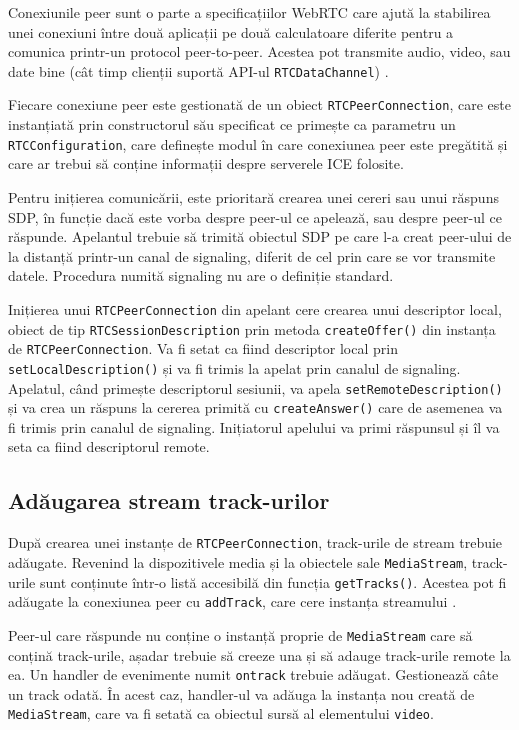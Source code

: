 \indent \par Conexiunile peer sunt o parte a specificațiilor WebRTC care ajută la stabilirea unei conexiuni între două aplicații pe două calculatoare diferite pentru a comunica printr-un protocol peer-to-peer. Acestea pot transmite audio, video, sau date bine (cât timp clienții suportă API-ul \texttt{RTCDataChannel}) \cite{WebPeer2014}.
\indent \par Fiecare conexiune peer este gestionată de un obiect \texttt{RTCPeerConnection}, care este instanțiată prin constructorul său specificat ce primește ca parametru un \texttt{RTCConfiguration}, care definește modul în care conexiunea peer este pregătită și care ar trebui să conține informații despre serverele ICE folosite.
\indent \par Pentru inițierea comunicării, este prioritară crearea unei cereri sau unui răspuns SDP, în funcție dacă este vorba despre peer-ul ce apelează, sau despre peer-ul ce răspunde. Apelantul trebuie să trimită obiectul SDP pe care l-a creat peer-ului de la distanță printr-un canal de signaling, diferit de cel prin care se vor transmite datele. Procedura numită signaling nu are o definiție standard.
\indent \par Inițierea unui \texttt{RTCPeerConnection} din apelant cere crearea unui descriptor local, obiect de tip \texttt{RTCSessionDescription} prin metoda \texttt{createOffer()} din instanța de \texttt{RTCPeerConnection}. Va fi setat ca fiind descriptor local prin \texttt{setLocalDescription()} și va fi trimis la apelat prin canalul de signaling. Apelatul, când primește descriptorul sesiunii, va apela \texttt{setRemoteDescription()} și va crea un răspuns la cererea primită cu \texttt{createAnswer()} care de asemenea va fi trimis prin canalul de signaling. Inițiatorul apelului va primi răspunsul și îl va seta ca fiind descriptorul remote.

\subsection{Adăugarea stream track-urilor}
\label{sec:ch2sec2subsec3}

\indent \par După crearea unei instanțe de \texttt{RTCPeerConnection}, track-urile de stream trebuie adăugate. Revenind la dispozitivele media și la obiectele sale \texttt{MediaStream}, track-urile sunt conținute într-o listă accesibilă din funcția \texttt{getTracks()}. Acestea pot fi adăugate la conexiunea peer cu \texttt{addTrack}, care cere instanța streamului \cite{WebStream2014}.
\indent \par Peer-ul care răspunde nu conține o instanță proprie de \texttt{MediaStream} care să conțină track-urile, așadar trebuie să creeze una și să adauge track-urile remote la ea. Un handler de evenimente numit \texttt{ontrack} trebuie adăugat. Gestionează câte un track odată. În acest caz, handler-ul va adăuga la instanța nou creată de \texttt{MediaStream}, care va fi setată ca obiectul sursă al elementului \texttt{video}.

